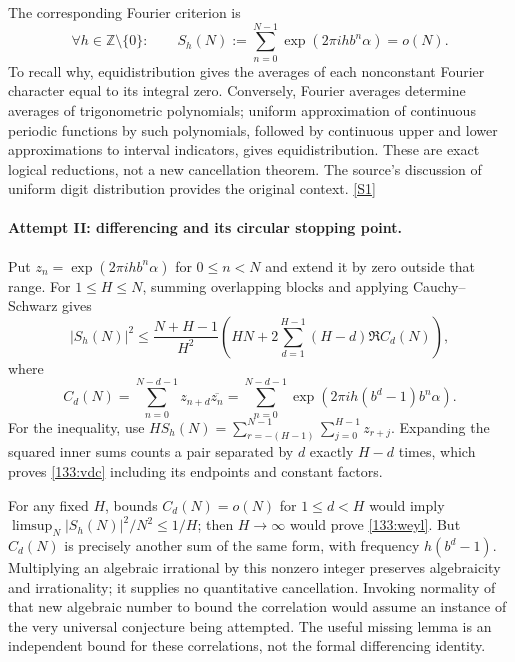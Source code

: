 \documentclass[11pt,a4paper]{article}
\newcommand{\Z}{\mathbb{Z}}
\newcommand{\sref}[2]{\hyperlink{source:#1:#2}{[S#2]}}
\numberwithin{equation}{section}
\begin{document}
The corresponding Fourier criterion is
\begin{equation}\label{133:weyl}
 \forall h\in\Z\setminus\{0\}:\qquad
 S_h(N):=\sum_{n=0}^{N-1}\exp(2\pi i h b^n\alpha)=o(N).
\end{equation}
To recall why, equidistribution gives the averages of each nonconstant
Fourier character equal to its integral zero.  Conversely, Fourier
averages determine averages of trigonometric polynomials; uniform
approximation of continuous periodic functions by such polynomials,
followed by continuous upper and lower approximations to interval
indicators, gives equidistribution.  These are exact logical
reductions, not a new cancellation theorem.  The source's discussion
of uniform digit distribution provides the original context.
\sref{133}{1}

\paragraph{Attempt II: differencing and its circular stopping point.}
Put $z_n=\exp(2\pi i h b^n\alpha)$ for $0\leq n<N$ and extend it by
zero outside that range.  For $1\leq H\leq N$, summing overlapping
blocks and applying Cauchy--Schwarz gives
\begin{equation}\label{133:vdc}
 |S_h(N)|^2\leq\frac{N+H-1}{H^2}
 \left(HN+2\sum_{d=1}^{H-1}(H-d)\Re C_d(N)\right),
\end{equation}
where
\[
 C_d(N)=\sum_{n=0}^{N-d-1}z_{n+d}\overline{z_n}
       =\sum_{n=0}^{N-d-1}
           \exp(2\pi i h(b^d-1)b^n\alpha).
\]
For the inequality, use
$HS_h(N)=\sum_{r=-(H-1)}^{N-1}\sum_{j=0}^{H-1}z_{r+j}$.
Expanding the squared inner sums counts a pair separated by $d$
exactly $H-d$ times, which proves \eqref{133:vdc} including its
endpoints and constant factors.

For any fixed $H$, bounds $C_d(N)=o(N)$ for $1\leq d<H$ would imply
$\limsup_N|S_h(N)|^2/N^2\leq1/H$; then $H\to\infty$ would prove
\eqref{133:weyl}.  But $C_d(N)$ is precisely another sum of the same
form, with frequency $h(b^d-1)$.  Multiplying an algebraic irrational
by this nonzero integer preserves algebraicity and irrationality;
it supplies no quantitative cancellation.  Invoking normality of
that new algebraic number to bound the correlation would assume an
instance of the very universal conjecture being attempted.  The
useful missing lemma is an independent bound for these correlations,
not the formal differencing identity.
\end{document}
